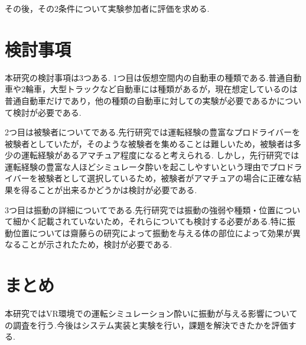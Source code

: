 \documentclass[uplatex]{jsarticle}
\begin{document}
その後，その2条件について実験参加者に評価を求める.

\section{検討事項}
本研究の検討事項は3つある.
1つ目は仮想空間内の自動車の種類である.普通自動車や2輪車，大型トラックなど自動車には種類があるが，現在想定しているのは普通自動車だけであり，他の種類の自動車に対しての実験が必要であるかについて検討が必要である.

2つ目は被験者についてである.先行研究では運転経験の豊富なプロドライバーを被験者としていたが，そのような被験者を集めることは難しいため，被験者は多少の運転経験があるアマチュア程度になると考えられる.
しかし，先行研究では運転経験の豊富な人ほどシミュレータ酔いを起こしやすいという理由でプロドライバーを被験者として選択しているため，被験者がアマチュアの場合に正確な結果を得ることが出来るかどうかは検討が必要である.

3つ目は振動の詳細についてである.先行研究では振動の強弱や種類・位置について細かく記載されていないため，それらについても検討する必要がある.特に振動位置については齋藤らの研究によって振動を与える体の部位によって効果が異なることが示されたため，検討が必要である.

\section{まとめ}
本研究ではVR環境での運転シミュレーション酔いに振動が与える影響についての調査を行う.今後はシステム実装と実験を行い，課題を解決できたかを評価する.


 
\end{document}

